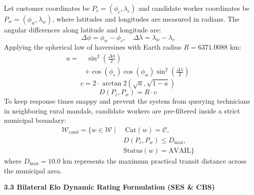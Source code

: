 \documentclass[10pt,twocolumn,a4paper]{article}
\begin{document}
Let customer coordinates be $P_c = (\phi_c, \lambda_c)$ and candidate worker coordinates be $P_w = (\phi_w, \lambda_w)$, where latitudes and longitudes are measured in radians. The angular differences along latitude and longitude are:
\begin{equation}
\Delta\phi = \phi_w - \phi_c, \quad \Delta\lambda = \lambda_w - \lambda_c
\end{equation}
Applying the spherical law of haversines with Earth radius $R = 6371.0088\text{ km}$:
\begin{equation}
\begin{aligned}
a = &\; \sin^2\left(\frac{\Delta\phi}{2}\right) \\
& + \cos(\phi_c)\cos(\phi_w)\sin^2\left(\frac{\Delta\lambda}{2}\right)
\end{aligned}
\end{equation}
\begin{equation}
c = 2 \cdot \arctan2\left(\sqrt{a}, \sqrt{1 - a}\right)
\end{equation}
\begin{equation}
D(P_c, P_w) = R \cdot c
\end{equation}
To keep response times snappy and prevent the system from querying technicians in neighboring rural mandals, candidate workers are pre-filtered inside a strict municipal boundary:
\begin{equation}
\begin{aligned}
\mathcal{W}_{\text{cand}} = \{ w \in \mathcal{W} \mid &\; \text{Cat}(w) = \mathcal{C}, \\
& D(P_c, P_w) \le D_{\max}, \\
& \text{Status}(w) = \text{AVAIL} \}
\end{aligned}
\end{equation}
where $D_{\max} = 10.0\text{ km}$ represents the maximum practical transit distance across the municipal area.

\vspace{0.8em}
\noindent
\textbf{3.3 Bilateral Elo Dynamic Rating Formulation (SES \& CBS)}
\end{document}
